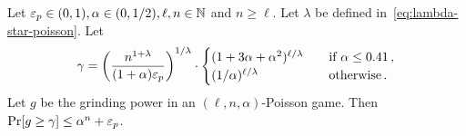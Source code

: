   \begin{lemma}\label{lemma:xor-game-poisson-gamma}
      Let $\mathsf{\varepsilon}_p \in (0, 1), \alpha \in (0, 1/2), \ell, n \in \mathbb{N}$ and $n \geq \ell$. 
      Let $\lambda$ be defined in~\eqref{eq:lambda-star-poisson}.
      Let 
      \begin{equation}
          \label{eq:xor-poisson-tail-gamma}
          \gamma = \left(\frac{n^{1 + \lambda} }{ (1+\alpha) \mathsf{\varepsilon}_p} \right)^{1/\lambda}
              \cdot \begin{cases}
                  (1 + 3 \alpha + \alpha^2)^{\ell/\lambda} &\quad\text{if $\alpha \leq 0.41$\,,} \\
                  (1/\alpha)^{\ell/\lambda} &\quad\text{otherwise\,.}
              \end{cases}
      \end{equation}
      Let $g$ be the grinding power in an $(\ell, n, \alpha)$-Poisson game. 
      Then $\Pr[g \geq \gamma] \leq \alpha^n + \mathsf{\varepsilon}_p$.
  \end{lemma}
